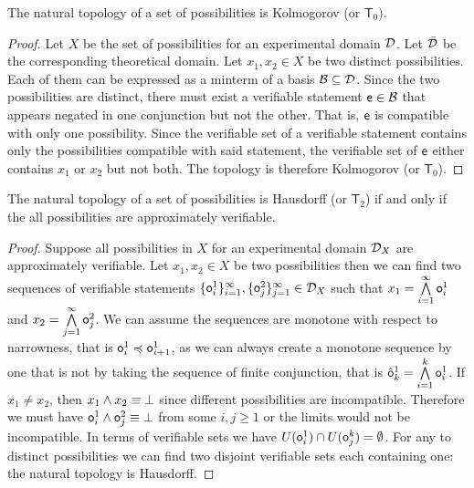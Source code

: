 \documentclass[11pt,letterpaper,fleqn]{memoir} %
\begin{document}
\begin{mathSection}
	\begin{prop}
	The natural topology of a set of possibilities is Kolmogorov (or $\mathsf{T}_0$).
\end{prop}
\begin{proof}
	Let $X$ be the set of possibilities for an experimental domain $\edomain$. Let $\tdomain$ be the corresponding theoretical domain. Let $x_1, x_2 \in X$ be two distinct possibilities. Each of them can be expressed as a minterm of a basis $\basis \subseteq \edomain$. Since the two possibilities are distinct, there must exist a verifiable statement $\obs[e] \in \basis$ that appears negated in one conjunction but not the other. That is, $\obs[e]$ is compatible with only one possibility. Since the verifiable set of a verifiable statement contains only the possibilities compatible with said statement, the verifiable set of $\obs[e]$ either contains $x_1$ or $x_2$ but not both. The topology is therefore Kolmogorov (or $\mathsf{T}_0$).
\end{proof}
	\begin{prop}
	The natural topology of a set of possibilities is Hausdorff (or $\mathsf{T}_2$) if and only if the all possibilities are approximately verifiable.
\end{prop}
\begin{proof}
	Suppose all possibilities in $X$ for an experimental domain $\edomain_X$ are approximately verifiable. Let $x_1, x_2 \in X$ be two possibilities then we can find two sequences of verifiable statements $\{\obs_i^1\}_{i=1}^\infty, \{\obs_j^2\}_{j=1}^\infty \in \edomain_X$ such that $x_1=\bigAND\limits_{i=1}^\infty \obs_i^1$ and $x_2=\bigAND\limits_{j=1}^\infty \obs_j^2$. We can assume the sequences are monotone with respect to narrowness, that is $\obs_i^1 \narrower \obs_{i+1}^1$, as we can always create a monotone sequence by one that is not by taking the sequence of finite conjunction, that is $\hat{\obs}_k^1=\bigAND\limits_{i=1}^k \obs_i^1$. If $x_1 \neq x_2$, then $x_1 \AND x_2 \equiv \contradiction$ since different possibilities are incompatible. Therefore we must have $\obs_i^1 \AND \obs_j^2 \equiv \contradiction$ from some $i,j \geq 1$ or the limits would not be incompatible. In terms of verifiable sets we have $U(\obs_i^1) \cap U(\obs_j^k) = \emptyset$. For any to distinct possibilities we can find two disjoint verifiable sets each containing one: the natural topology is Hausdorff.


\end{proof}
\end{mathSection}
\end{document}

